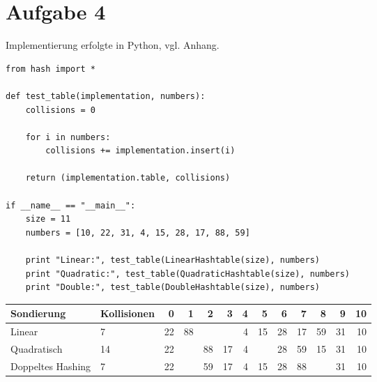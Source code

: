 \section*{Aufgabe 4}
Implementierung erfolgte in Python, vgl. Anhang. 

\begin{verbatim}
from hash import *

def test_table(implementation, numbers): 
	collisions = 0

	for i in numbers: 
		collisions += implementation.insert(i)

	return (implementation.table, collisions)

if __name__ == "__main__": 
	size = 11
	numbers = [10, 22, 31, 4, 15, 28, 17, 88, 59]

	print "Linear:", test_table(LinearHashtable(size), numbers)
	print "Quadratic:", test_table(QuadraticHashtable(size), numbers)
	print "Double:", test_table(DoubleHashtable(size), numbers)
\end{verbatim}

\vspace{0.5cm}

\begin{tabularx}{\textwidth}{|X|l||*{11}{r|}}
	\hline
    \textbf{Sondierung} & \textbf{Kollisionen} & 0 & 1 & 2 & 3 & 4 & 5 & 6 & 7 & 8 & 9 & 10 \\
    \hline
    Linear & \hphantom{1}7 & 22 & 88 &  &  & 4 & 15 & 28 & 17 & 59 & 31 & 10 \\
\hline
Quadratisch & 14 & 22 &  & 88 & 17 & 4 &  & 28 & 59 & 15 & 31 & 10 \\
\hline
Doppeltes Hashing & \hphantom{1}7 & 22 &  & 59 & 17 & 4 & 15 & 28 & 88 &  & 31 & 10 \\
\hline
\end{tabularx}
